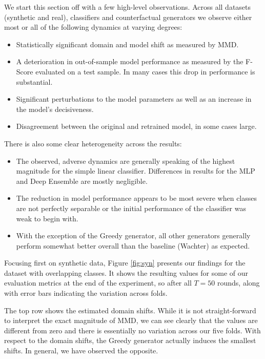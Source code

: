 \documentclass[conference,final,]{IEEEtran}
\providecommand{\tightlist}{%
  \setlength{\itemsep}{0pt}\setlength{\parskip}{0pt}}
\begin{document}
We start this section off with a few high-level observations. Across all datasets (synthetic and real), classifiers and counterfactual generators we observe either most or all of the following dynamics at varying degrees:

\begin{itemize}
\tightlist
\item
  Statistically significant domain and model shift as measured by MMD.
\item
  A deterioration in out-of-sample model performance as measured by the F-Score evaluated on a test sample. In many cases this drop in performance is substantial.
\item
  Significant perturbations to the model parameters as well as an increase in the model's decisiveness.
\item
  Disagreement between the original and retrained model, in some cases large.
\end{itemize}

There is also some clear heterogeneity across the results:

\begin{itemize}
\tightlist
\item
  The observed, adverse dynamics are generally speaking of the highest magnitude for the simple linear classifier. Differences in results for the MLP and Deep Ensemble are mostly negligible.
\item
  The reduction in model performance appears to be most severe when classes are not perfectly separable or the initial performance of the classifier was weak to begin with.
\item
  With the exception of the Greedy generator, all other generators generally perform somewhat better overall than the baseline (Wachter) as expected.
\end{itemize}

Focusing first on synthetic data, Figure \ref{fig:syn} presents our findings for the dataset with overlapping classes. It shows the resulting values for some of our evaluation metrics at the end of the experiment, so after all \(T=50\) rounds, along with error bars indicating the variation across folds.

The top row shows the estimated domain shifts. While it is not straight-forward to interpret the exact magnitude of MMD, we can see clearly that the values are different from zero and there is essentially no variation across our five folds. With respect to the domain shifts, the Greedy generator actually induces the smallest shifts. In general, we have observed the opposite.
\end{document}
